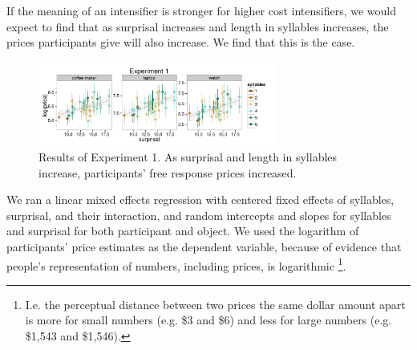 \documentclass[10pt,letterpaper]{article}
\begin{document}
If the meaning of an intensifier is stronger for higher cost intensifiers, we would expect to find that as surprisal increases and length in syllables increases, the prices participants give will also increase. We find that this is the case.

\begin{figure}[htb]
\begin{center}
\includegraphics[width=0.7\textwidth]{analysis_files_for_writeup/images/exp1-plot.pdf}
\end{center}
\caption{Results of Experiment 1. As surprisal and length in syllables increase, participants' free response prices increased.} 
\label{exp1-plot}
\end{figure}

We ran a linear mixed effects regression with centered fixed effects of syllables, surprisal, and their interaction, and random intercepts and slopes for syllables and surprisal for both participant and object.
We used the logarithm of participants' price estimates as the dependent variable, because of evidence that people's representation of numbers, including prices, is logarithmic \cite[e.g.]{dehaene}\footnote{I.e. the perceptual distance between two prices the same dollar amount apart is more for small numbers (e.g. \$3 and \$6) and less for large numbers (e.g. \$1,543 and \$1,546).}.
\end{document}
